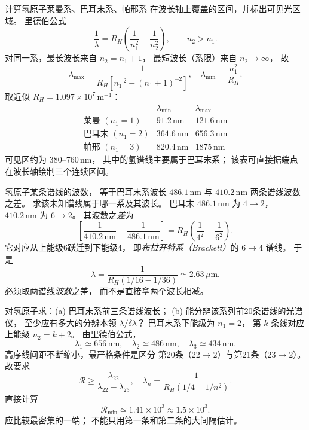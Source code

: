 计算氢原子莱曼系、巴耳末系、帕邢系
在波长轴上覆盖的区间，并标出可见光区域。
\exsolution
里德伯公式
\[
 \frac1\lambda=R_H\left(\frac1{n_1^2}-\frac1{n_2^2}\right),
 \qquad n_2>n_1.
\]
对同一系，最长波长来自 $n_2=n_1+1$，
最短波长（系限）来自 $n_2\to\infty$，
故
\[
 \lambda_{\max}=
 \frac1{R_H[n_1^{-2}-(n_1+1)^{-2}]},
 \quad
 \lambda_{\min}=\frac{n_1^2}{R_H}.
\]
取近似 $R_H=1.097\times10^7\,\mathrm{m^{-1}}$：
\[
 \boxed{\begin{array}{c|cc}
 &\lambda_{\min}&\lambda_{\max}\\\hline
 \text{莱曼 }(n_1=1)&91.2\,\mathrm{nm}&121.6\,\mathrm{nm}\\
 \text{巴耳末 }(n_1=2)&364.6\,\mathrm{nm}&656.3\,\mathrm{nm}\\
 \text{帕邢 }(n_1=3)&820.4\,\mathrm{nm}&1875\,\mathrm{nm}
 \end{array}}
\]
\excheck 可见区约为 $380$--$760\,\mathrm{nm}$，
其中的氢谱线主要属于巴耳末系；
该表可直接据端点在波长轴绘制三个连续区间。

氢原子某条谱线的波数，
等于巴耳末系波长
$486.1\,\mathrm{nm}$ 与 $410.2\,\mathrm{nm}$
两条谱线波数之差。
求该未知谱线属于哪一系及其波长。
\exsolution
巴耳末 $486.1\,\mathrm{nm}$ 为 $4\to2$，
$410.2\,\mathrm{nm}$ 为 $6\to2$。
其波数之\emph{差}为
\[
 \left[\frac1{410.2\,\mathrm{nm}}-
 \frac1{486.1\,\mathrm{nm}}\right]
 =R_H\left(\frac1{4^2}-\frac1{6^2}\right).
\]
它对应从上能级6跃迁到下能级4，
即\emph{布拉开特系（Brackett）}的 $6\to4$ 谱线。
于是
\[
 \boxed{\lambda=\frac1{R_H(1/16-1/36)}
 \simeq2.63\,\mu\mathrm m}.
\]
\excheck 必须取两谱线\emph{波数}之差，
而不是直接拿两个波长相减。

对氢原子求：(a) 巴耳末系前三条谱线波长；
(b) 能分辨该系列前20条谱线的光谱仪，
至少应有多大的分辨本领 $\lambda/\delta\lambda$？
\exsolution
巴耳末系下能级为 $n_1=2$，
第 $k$ 条线对应上能级 $n_2=k+2$。
由里德伯公式，
\[
 \boxed{\lambda_1\simeq656\,\mathrm{nm},\quad
 \lambda_2\simeq486\,\mathrm{nm},\quad
 \lambda_3\simeq434\,\mathrm{nm}}.
\]
高序线间距不断缩小，最严格条件是区分
第20条（$22\to2$）与第21条（$23\to2$）。
故要求
\[
 \mathcal R\ge
 \frac{\lambda_{22}}{\lambda_{22}-\lambda_{23}},
 \quad
 \lambda_n=\frac1{R_H(1/4-1/n^2)}.
\]
直接计算
\[
 \boxed{\mathcal R_{\min}\simeq1.41\times10^3
 \approx1.5\times10^3}.
\]
\excheck 应比较最密集的一端；
不能只用第一条和第二条的大间隔估计。

